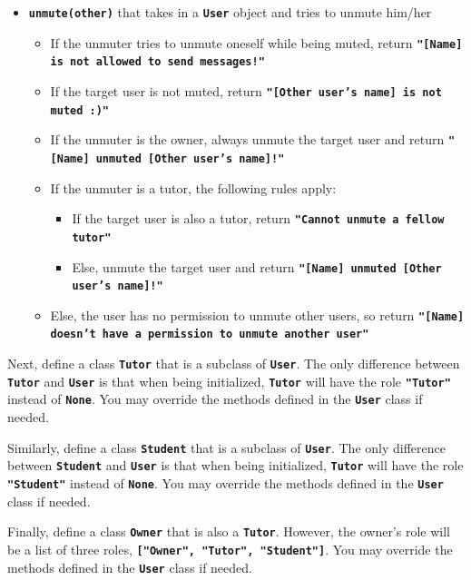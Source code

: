 \begin{itemize}
    \item \texttt{\bfseries unmute(other)} that takes in a \texttt{\bfseries User} object and tries to unmute him/her
    \begin{itemize}
        \item If the unmuter tries to unmute oneself while being muted, return \texttt{\bfseries "[Name] is not allowed to send messages!"}
        \item If the target user is not muted, return \texttt{\bfseries "[Other user's name] is not muted :)"}
        \item If the unmuter is the owner, always unmute the target user and return 
        \texttt{\bfseries "[Name] unmuted [Other user's name]!"}
        \item If the unmuter is a tutor, the following rules apply:
        \begin{itemize}
            \item If the target user is also a tutor, return \texttt{\bfseries "Cannot unmute a fellow tutor"}
            \item Else, unmute the target user and return \texttt{\bfseries "[Name] unmuted [Other user's name]!"}
        \end{itemize}
        \item Else, the user has no permission to unmute other users, so return 
        \texttt{\bfseries "[Name] doesn't have a permission to unmute another user"}
    \end{itemize}
\end{itemize}

Next, define a class \texttt{\bfseries Tutor} that is a subclass of \texttt{\bfseries User}. The only difference between \texttt{\bfseries Tutor} 
and \texttt{\bfseries User} is that when being initialized, \texttt{\bfseries Tutor} will have the role \texttt{\bfseries "Tutor"} instead 
of \texttt{\bfseries None}. You may override the methods defined in the \texttt{\bfseries User} class if needed.

Similarly, define a class \texttt{\bfseries Student} that is a subclass of \texttt{\bfseries User}. The only difference between \texttt{\bfseries Student} 
and \texttt{\bfseries User} is that when being initialized, \texttt{\bfseries Tutor} will have the role \texttt{\bfseries "Student"} instead 
of \texttt{\bfseries None}. You may override the methods defined in the \texttt{\bfseries User} class if needed.

Finally, define a class \texttt{\bfseries Owner} that is also a \texttt{\bfseries Tutor}. However, the owner's role will be a list of three roles,
\texttt{\bfseries ["Owner", "Tutor", "Student"]}. You may override the methods defined in the \texttt{\bfseries User} class if needed.

